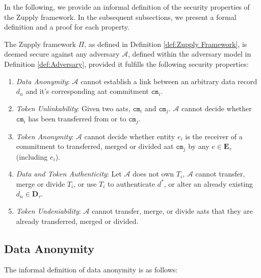 In the following, we provide an informal definition of the security properties of the Zupply framework. In the subsequent subsections, we present a formal definition and a proof for each property.

    \begin{definition}
    The Zupply framework $\Pi$, as defined in Definition \ref{def:Zupply Framework}, is deemed secure against any adversary $\mathcal{A}$, defined within the adversary model in Definition \ref{def:Adversary}, provided it fulfills the following security properties:

    \begin{enumerate}
        \item \textit{Data Anonymity}:  $\mathcal{A}$ cannot establish a link between an arbitrary data record $d_n$ and it's corresponding \gls{aat} commitment $\texttt{cm}_i$.

        \item \textit{Token Unlinkability}:  Given two \gls{aat}s, $\texttt{cm}_i$ and $\texttt{cm}_j$. $\mathcal{A}$ cannot decide whether $\texttt{cm}_i$ has been transferred from or to $\texttt{cm}_j$.

        \item \textit{Token Anonymity}: $\mathcal{A}$ cannot decide whether entity $e_i$ is the receiver of a commitment to transferred, merged or divided \gls{aat} $\texttt{cm}_j$ by any $e \in \mathbf{E}_\tau$ (including $e_i$).
        
        \item \textit{Data and Token Authenticity}:  Let $\mathcal{A}$ does not own $T_i$, $\mathcal{A}$ cannot transfer, merge or divide $T_i$, or use $T_i$ to authenticate $d^*$, or alter an already existing $d_{n} \in \mathbf{D}_\tau$.


        \item \textit{Token Undeniability}: $\mathcal{A}$ cannot transfer, merge, or divide \gls{aat}s that they are already transferred, merged or divided.

        \end{enumerate}
\end{definition}



\subsection{Data Anonymity}
\label{app-sec:Data Anonymity}

The informal definition of data anonymity is as follows:

